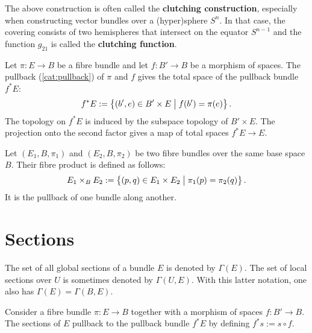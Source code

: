     \begin{remark}[Clutching]\label{bundle:clutching_theorem}
        The above construction is often called the \textbf{clutching construction}, especially when constructing vector bundles over a (hyper)sphere $S^n$. In that case, the covering consists of two hemispheres that intersect on the equator $S^{n-1}$ and the function $g_{21}$ is called the \textbf{clutching function}.
    \end{remark}

    \begin{construct}\label{bundle:pullback_bundle}
        Let $\pi:E\rightarrow B$ be a fibre bundle and let $f:B'\rightarrow B$ be a morphism of spaces. The pullback (\cref{cat:pullback}) of $\pi$ and $f$ gives the total space of the pullback bundle $f^*E$:
        \begin{gather}
            f^*E := \bigl\{(b',e)\in B'\times E\bigm\vert f(b') = \pi(e)\bigr\}\,.
        \end{gather}
        The topology on $f^*E$ is induced by the subspace topology of $B'\times E$. The projection onto the second factor gives a map of total spaces $f^*E\rightarrow E$.
    \end{construct}

    \begin{construct}\label{bundle:fibre_product}
        Let $(E_1,B,\pi_1)$ and $(E_2,B,\pi_2)$  be two fibre bundles over the same base space $B$. Their fibre product is defined as follows:
        \begin{gather}
            E_1\times_BE_2 := \bigl\{(p,q)\in E_1\times E_2\bigm\vert\pi_1(p) = \pi_2(q)\bigr\}\,.
        \end{gather}
        It is the pullback of one bundle along another.
    \end{construct}

\section{Sections}

    \begin{notation}
        The set of all global sections of a bundle $E$ is denoted by $\Gamma(E)$. The set of local sections over $U$ is sometimes denoted by $\Gamma(U,E)$. With this latter notation, one also has $\Gamma(E)=\Gamma(B,E)$.
    \end{notation}

    \begin{property}
        Consider a fibre bundle $\pi:E\rightarrow B$ together with a morphism of spaces $f:B'\rightarrow B$. The sections of $E$ pullback to the pullback bundle $f^*E$ by defining $f^*s := s\circ f$.
    \end{property}